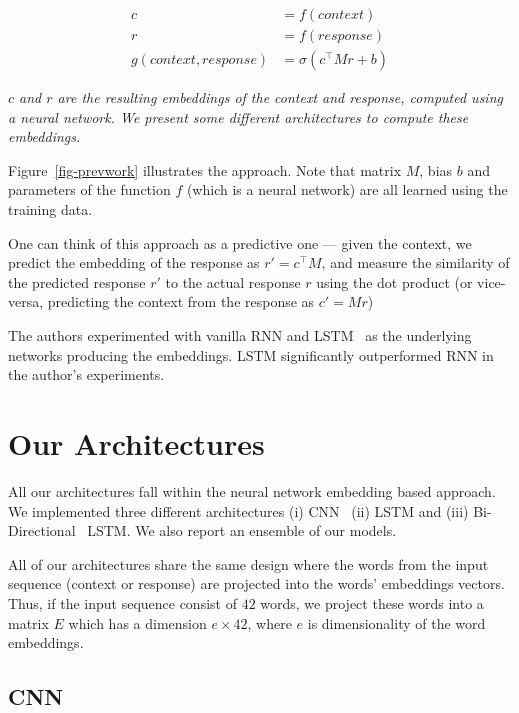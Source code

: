 \documentclass{article} \usepackage{nips15submit_e,times}
\newcommand{\MARTINSECOND}[1]{{\color{black}#1}} \newcommand{\MARTINTHIRD}[1]{{\color{black}#1}} \newcommand{\COPY}[1]{{\color{black}[#1]}}
\begin{document}
{\begin{align}
c &= f(context)\\
r &= f(response) \\
g(context, response) &= \sigma(c^{\top} M r + b)
\end{align}

\begingroup\vspace*{-\baselineskip}
{
    \emph{
    $c$ and $r$ are the resulting embeddings of the context and response, computed using a neural network.
    We present some different architectures to compute these embeddings.
    }
}
\vspace*{\baselineskip}\endgroup



Figure~\ref{fig-prevwork} illustrates the approach. Note that matrix $M$, bias $b$ and parameters of the function $f$ (which is a neural network) are all learned using the training data.

One can think of this approach as a predictive one --- given the context,
we predict the embedding of the response as
$r' = c^{\top}M$, and measure the similarity of the predicted response $r'$ to the actual response $r$ using the dot product
(or vice-versa, predicting the context from the response as $c' = Mr$)

The authors experimented with vanilla RNN and LSTM~\cite{Hochreiter1997} as the underlying networks producing the embeddings.
LSTM significantly outperformed RNN in the author's experiments.
}


\section{Our Architectures}

\MARTINSECOND
{


All our architectures fall within the neural network embedding based approach.
We implemented three different architectures
(i) CNN~\cite{kim2014convolutional} (ii) LSTM and (iii) Bi-Directional~\cite{Schuster1997} LSTM.
We also report an ensemble of our models.

All of our architectures share the same design where the words from the input sequence (context or response) are projected
into the words' embeddings vectors.
Thus, if the input sequence consist of $42$ words, we project these words into a matrix $E$ which has
a dimension $e \times 42$, where $e$ is dimensionality of the word embeddings.
}
\subsection{CNN}
\end{document}
